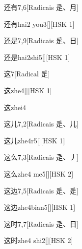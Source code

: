 \begin{entry}{还有}{7,6}[Radicais ⾡、⽉]
  \begin{phonetics}{还有}{hai2 you3}[][HSK 1]
  \end{phonetics}
\end{entry}

\begin{entry}{还是}{7,9}[Radicais ⾡、⽇]
  \begin{phonetics}{还是}{hai2shi5}[][HSK 1]
  \end{phonetics}
\end{entry}

\begin{entry}{这}{7}[Radical ⾡]
  \begin{phonetics}{这}{zhe4}[][HSK 1]
  \end{phonetics}
  \begin{phonetics}{这}{zhei4}
  \end{phonetics}
\end{entry}

\begin{entry}{这儿}{7,2}[Radicais ⾡、⼉]
  \begin{phonetics}{这儿}{zhe4r5}[][HSK 1]
  \end{phonetics}
\end{entry}

\begin{entry}{这么}{7,3}[Radicais ⾡、⼃]
  \begin{phonetics}{这么}{zhe4 me5}[][HSK 2]
  \end{phonetics}
\end{entry}

\begin{entry}{这边}{7,5}[Radicais ⾡、⾡]
  \begin{phonetics}{这边}{zhe4bian5}[][HSK 1]
  \end{phonetics}
\end{entry}

\begin{entry}{这时}{7,7}[Radicais ⾡、⽇]
  \begin{phonetics}{这时}{zhe4 shi2}[][HSK 2]
  \end{phonetics}
\end{entry}

